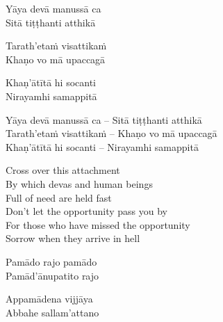 \ifninebythirteen

\begin{pali-hang-verses}
  Yāya devā manussā ca\\
  Sitā tiṭṭhanti atthikā\\
\end{pali-hang-verses}
\begin{pali-hang-together}
  Tarath'etaṁ visattikaṁ\\
  Khaṇo vo mā upaccagā
\end{pali-hang-together}
\begin{pali-hang-together}
  Khaṇ'ātītā hi socanti\\
  Nirayamhi samappitā
\end{pali-hang-together}

\clearpage

\else

\begin{verses}
  Yāya devā manussā ca – Sitā tiṭṭhanti atthikā\\
  Tarath'etaṁ visattikaṁ – Khaṇo vo mā upaccagā\\
  Khaṇ'ātītā hi socanti – Nirayamhi samappitā
\end{verses}

\fi

\ifbfive\enlargethispage{1.5\baselineskip}\fi

\begin{english-verses}
  Cross over this attachment\\
  By which devas and human beings\\
  Full of need are held fast\\
  Don't let the opportunity pass you by\\
  For those who have missed the opportunity\\
  Sorrow when they arrive in hell
\end{english-verses}

\ifafive\clearpage\fi

\ifninebythirteen

\begin{pali-hang-verses}
  Pamādo rajo pamādo\\
  Pamād'ānupatito rajo
\end{pali-hang-verses}
\begin{pali-hang-together}
  Appamādena vijjāya\\
  Abbahe sallam'attano
\end{pali-hang-together}

\else

